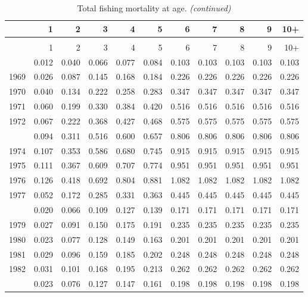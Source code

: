 \documentclass[
]{article}
\begin{document}
\begin{longtable}[t]{lrrrrrrrrrr}
\caption{\label{tab:FAA-tot-table}Total fishing mortality at age.}\\
\toprule
  & 1 & 2 & 3 & 4 & 5 & 6 & 7 & 8 & 9 & 10+\\
\midrule
\endfirsthead
\caption[]{Total fishing mortality at age. \textit{(continued)}}\\
\toprule
  & 1 & 2 & 3 & 4 & 5 & 6 & 7 & 8 & 9 & 10+\\
\midrule
\endhead

\endfoot
\bottomrule
\endlastfoot
1968 & 0.012 & 0.040 & 0.066 & 0.077 & 0.084 & 0.103 & 0.103 & 0.103 & 0.103 & 0.103\\
1969 & 0.026 & 0.087 & 0.145 & 0.168 & 0.184 & 0.226 & 0.226 & 0.226 & 0.226 & 0.226\\
1970 & 0.040 & 0.134 & 0.222 & 0.258 & 0.283 & 0.347 & 0.347 & 0.347 & 0.347 & 0.347\\
1971 & 0.060 & 0.199 & 0.330 & 0.384 & 0.420 & 0.516 & 0.516 & 0.516 & 0.516 & 0.516\\
1972 & 0.067 & 0.222 & 0.368 & 0.427 & 0.468 & 0.575 & 0.575 & 0.575 & 0.575 & 0.575\\
\addlinespace
1973 & 0.094 & 0.311 & 0.516 & 0.600 & 0.657 & 0.806 & 0.806 & 0.806 & 0.806 & 0.806\\
1974 & 0.107 & 0.353 & 0.586 & 0.680 & 0.745 & 0.915 & 0.915 & 0.915 & 0.915 & 0.915\\
1975 & 0.111 & 0.367 & 0.609 & 0.707 & 0.774 & 0.951 & 0.951 & 0.951 & 0.951 & 0.951\\
1976 & 0.126 & 0.418 & 0.692 & 0.804 & 0.881 & 1.082 & 1.082 & 1.082 & 1.082 & 1.082\\
1977 & 0.052 & 0.172 & 0.285 & 0.331 & 0.363 & 0.445 & 0.445 & 0.445 & 0.445 & 0.445\\
\addlinespace
1978 & 0.020 & 0.066 & 0.109 & 0.127 & 0.139 & 0.171 & 0.171 & 0.171 & 0.171 & 0.171\\
1979 & 0.027 & 0.091 & 0.150 & 0.175 & 0.191 & 0.235 & 0.235 & 0.235 & 0.235 & 0.235\\
1980 & 0.023 & 0.077 & 0.128 & 0.149 & 0.163 & 0.201 & 0.201 & 0.201 & 0.201 & 0.201\\
1981 & 0.029 & 0.096 & 0.159 & 0.185 & 0.202 & 0.248 & 0.248 & 0.248 & 0.248 & 0.248\\
1982 & 0.031 & 0.101 & 0.168 & 0.195 & 0.213 & 0.262 & 0.262 & 0.262 & 0.262 & 0.262\\
\addlinespace
1983 & 0.023 & 0.076 & 0.127 & 0.147 & 0.161 & 0.198 & 0.198 & 0.198 & 0.198 & 0.198\\

\end{longtable}
\end{document}
